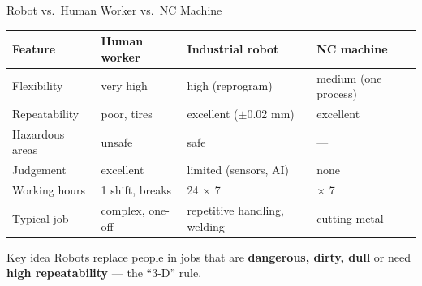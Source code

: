 \documentclass[aspectratio=169]{beamer}
\begin{document}
	\begin{frame}{Robot vs.\ Human Worker vs.\ NC Machine}
		\renewcommand{\arraystretch}{1.3}
		\centering
		\small
		\begin{tabular}{@{}>{\raggedright}p{3.0cm}>{\raggedright}p{3.2cm}>{\raggedright}p{3.2cm}>{\raggedright\arraybackslash}p{3.2cm}@{}}
			\toprule
			\textbf{Feature} & \textbf{Human worker} & \textbf{Industrial robot} & \textbf{NC machine} \\
			\midrule
			Flexibility      & very high               & high (reprogram)          & medium (one process) \\
			Repeatability    & poor, tires             & excellent ($\pm$0.02 mm)  & excellent \\
			Hazardous areas  & unsafe                  & safe                      & --- \\
			Judgement        & excellent               & limited (sensors, AI)     & none \\
			Working hours    & 1 shift, breaks         & 24 $\times$ 7             & 24 $\times$ 7 \\
			Typical job      & complex, one-off        & repetitive handling, welding & cutting metal \\
			\bottomrule
		\end{tabular}
		\vspace{0.3cm}
		\begin{block}{Key idea}
			\small Robots replace people in jobs that are \textbf{dangerous, dirty, dull} or need \textbf{high repeatability} --- the ``3-D'' rule.
		\end{block}
	\end{frame}

\end{document}
